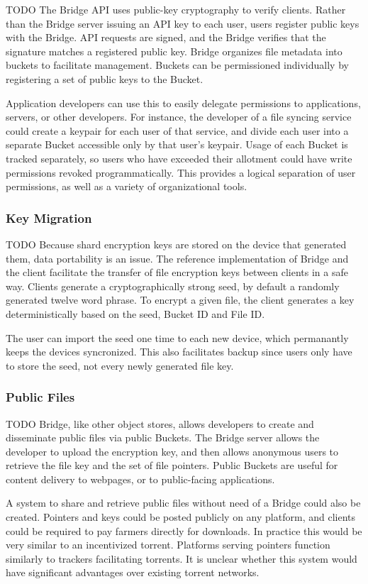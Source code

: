 \documentclass[a4paper,10pt]{article}
\newcommand{\todo}[1]{{\color{red} TODO #1}}
\begin{document}
\todo{
The Bridge API uses public-key cryptography to verify clients. Rather than the
Bridge server issuing an API key to each user, users register public keys with
the Bridge. API requests are signed, and the Bridge verifies that the signature
matches a registered public key. Bridge organizes file metadata into buckets to
facilitate management. Buckets can be permissioned individually by registering a
set of public keys to the Bucket.

Application developers can use this to easily delegate permissions to
applications, servers, or other developers. For instance, the developer of a
file syncing service could create a keypair for each user of that service, and
divide each user into a separate Bucket accessible only by that user’s keypair.
Usage of each Bucket is tracked separately, so users who have exceeded their
allotment could have write permissions revoked programmatically. This provides a
logical separation of user permissions, as well as a variety of organizational
tools.
}

\subsubsection{Key Migration}

\todo{
Because shard encryption keys are stored on the device that generated them, data
portability is an issue. The reference implementation of Bridge and the client
facilitate the transfer of file encryption keys between clients in a safe way.
Clients generate a cryptographically strong seed, by default a randomly
generated twelve word phrase. To encrypt a given file, the client generates a
key deterministically based on the seed, Bucket ID and File ID.

The user can import the seed one time to each new device, which permanantly
keeps the devices syncronized. This also facilitates backup since users only
have to store the seed, not every newly generated file key.
}

\subsubsection{Public Files}

\todo{
Bridge, like other object stores, allows developers to create and disseminate
public files via public Buckets. The Bridge server allows the developer to
upload the encryption key, and then allows anonymous users to retrieve the file
key and the set of file pointers. Public Buckets are useful for content delivery
to webpages, or to public-facing applications.

A system to share and retrieve public files without need of a Bridge could also
be created. Pointers and keys could be posted publicly on any platform, and
clients could be required to pay farmers directly for downloads. In practice
this would be very similar to an incentivized torrent. Platforms serving
pointers function similarly to trackers facilitating torrents. It is unclear
whether this system would have significant advantages over existing torrent
networks.
}
\end{document}
